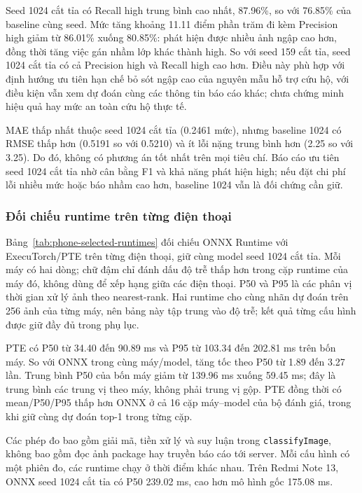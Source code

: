

Seed 1024 cắt tỉa có Recall high trung bình cao nhất, 87.96\%, so với 76.85\% của baseline cùng seed. Mức tăng khoảng 11.11 điểm phần trăm đi kèm Precision high giảm từ 86.01\% xuống 80.85\%: phát hiện được nhiều ảnh ngập cao hơn, đồng thời tăng việc gán nhầm lớp khác thành high. So với seed 159 cắt tỉa, seed 1024 cắt tỉa có cả Precision high và Recall high cao hơn. Điều này phù hợp với định hướng ưu tiên hạn chế bỏ sót ngập cao của nguyên mẫu hỗ trợ cứu hộ, với điều kiện vẫn xem dự đoán cùng các thông tin báo cáo khác; chưa chứng minh hiệu quả hay mức an toàn cứu hộ thực tế.

MAE thấp nhất thuộc seed 1024 cắt tỉa (0.2461 mức), nhưng baseline 1024 có RMSE thấp hơn (0.5191 so với 0.5210) và ít lỗi nặng trung bình hơn (2.25 so với 3.25). Do đó, không có phương án tốt nhất trên mọi tiêu chí. Báo cáo ưu tiên seed 1024 cắt tỉa nhờ cân bằng F1 và khả năng phát hiện high; nếu đặt chi phí lỗi nhiều mức hoặc báo nhầm cao hơn, baseline 1024 vẫn là đối chứng cần giữ.

\subsubsection{Đối chiếu runtime trên từng điện thoại}
Bảng~\ref{tab:phone-selected-runtimes} đối chiếu ONNX Runtime với ExecuTorch/PTE trên từng điện thoại, giữ cùng model seed 1024 cắt tỉa. Mỗi máy có hai dòng; chữ đậm chỉ đánh dấu độ trễ thấp hơn trong cặp runtime của máy đó, không dùng để xếp hạng giữa các điện thoại. P50 và P95 là các phân vị thời gian xử lý ảnh theo nearest-rank. Hai runtime cho cùng nhãn dự đoán trên 256 ảnh của từng máy, nên bảng này tập trung vào độ trễ; kết quả từng cấu hình được giữ đầy đủ trong phụ lục.



PTE có P50 từ 34.40 đến 90.89 ms và P95 từ 103.34 đến 202.81 ms trên bốn máy. So với ONNX trong cùng máy/model, tăng tốc theo P50 từ 1.89 đến 3.27 lần. Trung bình P50 của bốn máy giảm từ 139.96 ms xuống 59.45 ms; đây là trung bình các trung vị theo máy, không phải trung vị gộp. PTE đồng thời có mean/P50/P95 thấp hơn ONNX ở cả 16 cặp máy--model của bộ đánh giá, trong khi giữ cùng dự đoán top-1 trong từng cặp.

Các phép đo bao gồm giải mã, tiền xử lý và suy luận trong \texttt{classifyImage}, không bao gồm đọc ảnh package hay truyền báo cáo tới server. Mỗi cấu hình có một phiên đo, các runtime chạy ở thời điểm khác nhau. Trên Redmi Note 13, ONNX seed 1024 cắt tỉa có P50 239.02 ms, cao hơn mô hình gốc 175.08 ms.

